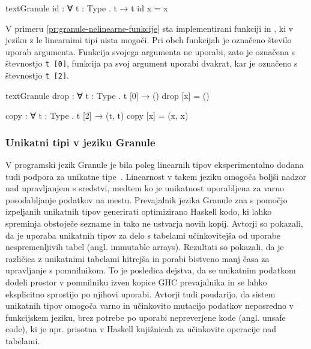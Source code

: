 \begin{primer}[ht]
\centering
\begin{code-box}{text}{Granule \cmark}
id : ∀ {t : Type} . t → t
id x = x
\end{code-box}
\caption{Implementacija identitete v programskem jeziku Granule}
\label{pr:granule-identiteta}
\end{primer}

V primeru \ref{pr:granule-nelinearne-funkcije} sta implementirani funkciji  in , ki v jeziku z le linearnimi tipi nista mogoči. Pri obeh funkcijah je označeno število uporab argumenta. Funkcija  svojega argumenta ne uporabi, zato je označena s števnostjo \texttt{t [0]}, funkcija  pa svoj argument uporabi dvakrat, kar je označeno s števnostjo \texttt{t [2]}.

\begin{primer}[ht]
\centering
\begin{code-box}{text}{Granule \cmark}
drop : ∀ {t : Type} . t [0] → ()
drop [x] = ()

copy : ∀ {t : Type} . t [2] → (t, t)
copy [x] = (x, x)
\end{code-box}
\caption{Nelinearni funkciji  in , implementirani v programskem jeziku Granule}
\label{pr:granule-nelinearne-funkcije}
\end{primer}


\subsubsection{Unikatni tipi v jeziku Granule}
V programski jezik Granule je bila poleg linearnih tipov eksperimentalno dodana tudi podpora za unikatne tipe~\cite{marshall2022linearity}. Linearnost v takem jeziku omogoča boljši nadzor nad upravljanjem s sredstvi, medtem ko je unikatnost uporabljena za varno posodabljanje podatkov na mestu. Prevajalnik jezika Granule zna s pomočjo izpeljanih unikatnih tipov generirati optimizirano Haskell kodo, ki lahko spreminja obstoječe sezname in tako ne ustvarja novih kopij. Avtorji so pokazali, da je uporaba unikatnih tipov za delo s tabelami učinkovitejša od uporabe nespremenljivih tabel (angl. immutable arrays). Rezultati so pokazali, da je različica z unikatnimi tabelami hitrejša in porabi bistveno manj časa za upravljanje s pomnilnikom. To je posledica dejstva, da se unikatnim podatkom dodeli prostor v pomnilniku izven kopice GHC prevajalnika in se lahko eksplicitno sprostijo po njihovi uporabi. Avtorji tudi poudarijo, da sistem unikatnih tipov omogoča varno in učinkovito mutacijo podatkov neposredno v funkcijskem jeziku, brez potrebe po uporabi nepreverjene kode (angl. unsafe code), ki je npr. prisotna v Haskell knjižnicah za učinkovite operacije nad tabelami.

